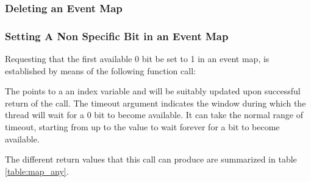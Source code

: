 \subsubsection{Deleting an Event Map} 

\subsubsection{Setting A Non Specific Bit in an Event Map}

Requesting that the first available 0 bit be set to 1 in an event map, is
established by means of the following function call:


The  points to a an index variable and will be suitably
updated upon successful return of the call. The timeout argument
 indicates the window during which the thread will wait for a 0
bit to become available. It can take the normal range of timeout, starting
from  up to the value  to wait
forever for a bit to become available. 

The different return values that this call can produce are summarized
in table \ref{table:map_any}.  




